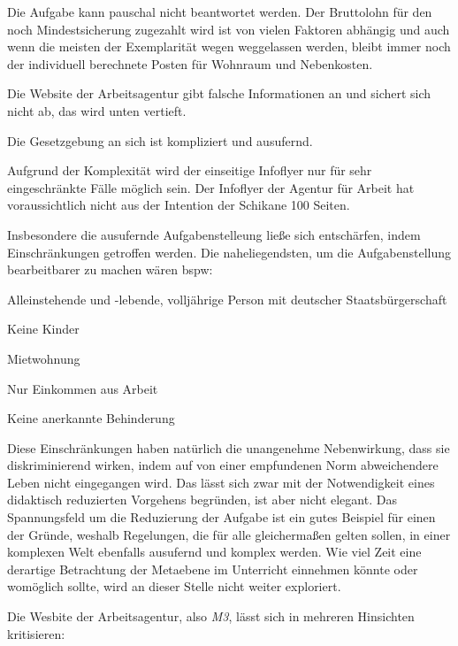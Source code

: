 \begin{myitemize}
    \item Die Aufgabe kann pauschal nicht beantwortet werden. Der Bruttolohn für den noch Mindestsicherung zugezahlt wird ist von vielen Faktoren abhängig und auch wenn die meisten der Exemplarität wegen weggelassen werden, bleibt immer noch der individuell berechnete Posten für Wohnraum und Nebenkosten. 
    \item Die Website der Arbeitsagentur gibt falsche Informationen an und sichert sich nicht ab, das wird unten vertieft.
    \item Die Gesetzgebung an sich ist kompliziert und ausufernd. 
    \item Aufgrund der Komplexität wird der einseitige Infoflyer nur für sehr eingeschränkte Fälle möglich sein. Der Infoflyer der Agentur für Arbeit hat voraussichtlich nicht aus der Intention der Schikane 100 Seiten. 
\end{myitemize}
Insbesondere die ausufernde Aufgabenstelleung ließe sich entschärfen, indem Einschränkungen getroffen werden.
Die naheliegendsten, um die Aufgabenstellung bearbeitbarer zu machen wären \gls{bspw}:
\begin{myitemize}
    \item Alleinstehende und -lebende, volljährige Person mit deutscher Staatsbürgerschaft
    \item Keine Kinder
    \item Mietwohnung
    \item Nur Einkommen aus Arbeit
    \item Keine anerkannte Behinderung
\end{myitemize}
Diese Einschränkungen haben natürlich die unangenehme Nebenwirkung, dass sie diskriminierend wirken, indem auf von einer empfundenen Norm abweichendere Leben nicht eingegangen wird. Das lässt sich zwar mit der Notwendigkeit eines didaktisch reduzierten Vorgehens begründen, ist aber nicht elegant. 
Das Spannungsfeld um die Reduzierung der Aufgabe ist ein gutes Beispiel für einen der Gründe, weshalb Regelungen, die für alle gleichermaßen gelten sollen, in einer komplexen Welt ebenfalls ausufernd und komplex werden. Wie viel Zeit eine derartige  Betrachtung der Metaebene im Unterricht einnehmen könnte oder womöglich sollte, wird an dieser Stelle nicht weiter exploriert. 


Die Wesbite der Arbeitsagentur, also \emph{M3}, lässt sich in mehreren Hinsichten kritisieren: 

